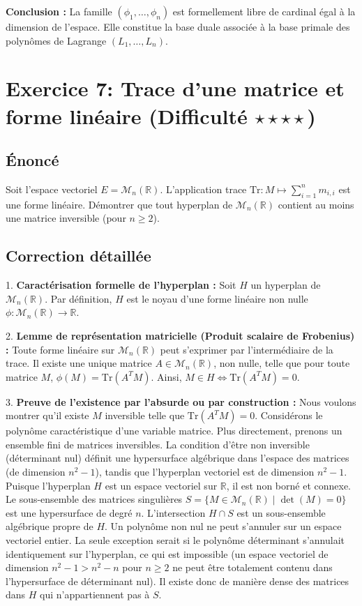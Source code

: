 \documentclass[11pt,a4paper]{report}
\begin{document}
\textbf{Conclusion :}
La famille $(\phi_1, \dots, \phi_n)$ est formellement libre de cardinal égal à la dimension de l'espace. Elle constitue la base duale associée à la base primale des polynômes de Lagrange $(L_1, \dots, L_n)$.

\section{Exercice 7: Trace d'une matrice et forme linéaire (Difficulté $\star \star \star \star$)}

\subsection{Énoncé}
Soit l'espace vectoriel $E = \mathcal{M}_n(\mathbb{R})$. L'application trace $\text{Tr} : M \mapsto \sum_{i=1}^n m_{i,i}$ est une forme linéaire. Démontrer que tout hyperplan de $\mathcal{M}_n(\mathbb{R})$ contient au moins une matrice inversible (pour $n \ge 2$).

\subsection{Correction détaillée}

1. \textbf{Caractérisation formelle de l'hyperplan :}
   Soit $H$ un hyperplan de $\mathcal{M}_n(\mathbb{R})$. Par définition, $H$ est le noyau d'une forme linéaire non nulle $\phi : \mathcal{M}_n(\mathbb{R}) \to \mathbb{R}$.

2. \textbf{Lemme de représentation matricielle (Produit scalaire de Frobenius) :}
   Toute forme linéaire sur $\mathcal{M}_n(\mathbb{R})$ peut s'exprimer par l'intermédiaire de la trace. Il existe une unique matrice $A \in \mathcal{M}_n(\mathbb{R})$, non nulle, telle que pour toute matrice $M$, $\phi(M) = \text{Tr}(A^T M)$.
   Ainsi, $M \in H \iff \text{Tr}(A^T M) = 0$.

3. \textbf{Preuve de l'existence par l'absurde ou par construction :}
   Nous voulons montrer qu'il existe $M$ inversible telle que $\text{Tr}(A^T M) = 0$.
   Considérons le polynôme caractéristique d'une variable matrice. Plus directement, prenons un ensemble fini de matrices inversibles. La condition d'être non inversible (déterminant nul) définit une hypersurface algébrique dans l'espace des matrices (de dimension $n^2-1$), tandis que l'hyperplan vectoriel est de dimension $n^2-1$.
   Puisque l'hyperplan $H$ est un espace vectoriel sur $\mathbb{R}$, il est non borné et connexe. Le sous-ensemble des matrices singulières $S = \{M \in \mathcal{M}_n(\mathbb{R}) \mid \det(M) = 0\}$ est une hypersurface de degré $n$.
   L'intersection $H \cap S$ est un sous-ensemble algébrique propre de $H$. Un polynôme non nul ne peut s'annuler sur un espace vectoriel entier. La seule exception serait si le polynôme déterminant s'annulait identiquement sur l'hyperplan, ce qui est impossible (un espace vectoriel de dimension $n^2-1 > n^2-n$ pour $n \ge 2$ ne peut être totalement contenu dans l'hypersurface de déterminant nul).
   Il existe donc de manière dense des matrices dans $H$ qui n'appartiennent pas à $S$.
\end{document}
